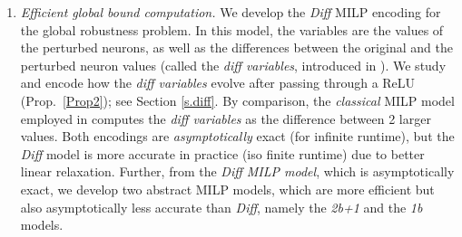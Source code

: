 \begin{enumerate}
\item {\em Efficient global bound computation.}
We develop the {\em Diff} MILP encoding for the global robustness problem.
In this model, the variables are the values of the perturbed neurons, as well as the differences between the original and the perturbed neuron values (called the {\em diff variables}, introduced in \citet{diff}). We study and encode how the {\em diff variables} evolve after passing through a ReLU (Prop.~\ref{Prop2}); see Section \ref{s.diff}. By comparison, the {\em classical} MILP model \citep{MILP} employed in \citet{vhagar,lipshitz,ITNE} 
computes the {\em diff variables} as the difference between 2 larger values.
Both encodings are {\em asymptotically} exact (for infinite runtime), but the {\em Diff} model is more accurate in practice (iso finite runtime) due to better linear relaxation.
Further, from the {\em Diff MILP model}, which is asymptotically exact, we develop two abstract MILP models, which are more efficient but also asymptotically less accurate than {\em Diff}, namely the {\em 2b+1} and the {\em 1b} models.
	

\end{enumerate}
